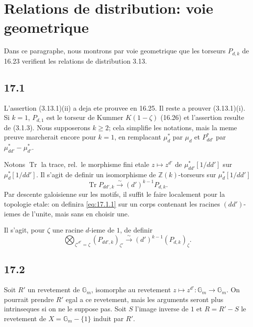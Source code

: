 \documentclass[12pt,a4paper]{article}
\theoremstyle{plain}
\theoremstyle{definition}
\theoremstyle{remark}
\DeclareMathOperator{\Tr}{Tr}
\newcommand{\Gm}{\mathbb{G}_m}
\newcommand{\ZZ}{\mathbb{Z}}
\begin{document}
\section{Relations de distribution: voie geometrique}\label{sec:17}

Dans ce paragraphe, nous montrons par voie geometrique que les
torseurs $P_{d,k}$ de 16.23 verifient les relations de distribution 3.13.

\subsection{17.1}

L'assertion (3.13.1)(ii) a deja ete prouvee en 16.25. Il reste a
prouver (3.13.1)(i). Si $k=1$, $P_{d,1}$ est le torseur de Kummer
$K(1-\zeta)$ (16.26) et l'assertion resulte de (3.1.3). Nous
supposerons $k \geq 2$; cela simplifie les notations, mais la meme
preuve marcherait encore pour $k=1$, en remplacant $\mu_d^*$ par
$\mu_d$ et $P_{dd'}^*$ par $\mu_{dd'}^* - \mu_{d'}^*$.

Notons $\Tr$ la trace, rel.\ le morphisme fini etale
$z \mapsto z^{d'}$ de $\mu_{dd'}^*[1/dd']$ sur $\mu_d^*[1/dd']$. Il
s'agit de definir un isomorphisme de $\ZZ(k)$-torseurs sur
$\mu_d^*[1/dd']$
\begin{equation}\label{eq:17.1.1}
\Tr P_{dd',k} \xrightarrow{\sim} (d')^{k-1} P_{d,k}.
\end{equation}
Par descente galoisienne sur les motifs, il suffit le faire localement
pour la topologie etale: on definira \eqref{eq:17.1.1} sur un corps
contenant les racines $(dd')$-iemes de l'unite, mais sans en choisir
une.

Il s'agit, pour $\zeta$ une racine $d$-ieme de $1$, de definir
\begin{equation}\label{eq:17.1.2}
\bigotimes_{\zeta'^{d'}=\zeta} (P_{dd',k})_{\zeta'}
\xrightarrow{\sim} (d')^{k-1}(P_{d,k})_\zeta.
\end{equation}

\subsection{17.2}

Soit $R'$ un revetement de $\Gm$, isomorphe au revetement
$z \mapsto z^{d'} : \Gm \to \Gm$. On pourrait prendre $R'$ egal a ce
revetement, mais les arguments seront plus intrinseques si on ne le
suppose pas. Soit $S$ l'image inverse de $1$ et $R = R' - S$ le
revetement de $X = \Gm - \{1\}$ induit par $R'$.
\end{document}

